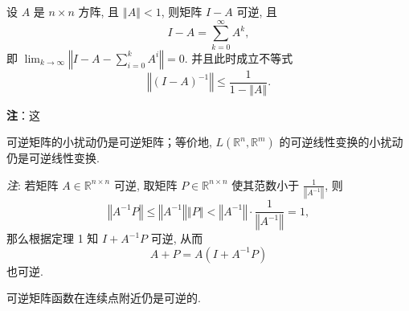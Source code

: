 \begin{theorem}{}
设 $A$ 是 $n\times n$ 方阵, 且 $\left\Vert A\right\Vert <1$, 则矩阵 $I-A$
可逆, 且 
\[
I-A=\sum_{k=0}^{\infty}A^{k},
\]
即 ${\displaystyle \lim_{k\rightarrow\infty}}\left\Vert I-A-{\displaystyle \sum_{i=0}^{k}A^{i}}\right\Vert =0.$
并且此时成立不等式
\[
\left\Vert (I-A)^{-1}\right\Vert \leqslant{\displaystyle \frac{1}{1-\left\Vert A\right\Vert }.}
\]
\end{theorem}
\textbf{注}：这


\begin{corollary}{}
可逆矩阵的小扰动仍是可逆矩阵；等价地, $L(\mathbb{R}^{n},\mathbb{R}^{m})$ 的可逆线性变换的小扰动仍是可逆线性变换.
\end{corollary}

\textsl{注}: 若矩阵 $A\in\mathbb{R}^{n\times n}$ 可逆, 取矩阵 $P\in\mathbb{R}^{n\times n}$
使其范数小于 $\frac{1}{\left\Vert A^{-1}\right\Vert }$, 则
\[
\left\Vert A^{-1}P\right\Vert \leqslant\left\Vert A^{-1}\right\Vert \left\Vert P\right\Vert <\left\Vert A^{-1}\right\Vert \cdot{\displaystyle \frac{1}{\left\Vert A^{-1}\right\Vert }=1,}
\]
那么根据定理 1 知 $I+A^{-1}P$ 可逆, 从而
\[
A+P=A(I+A^{-1}P)
\]
也可逆. 

\begin{corollary}{}
可逆矩阵函数在连续点附近仍是可逆的.
\end{corollary} 